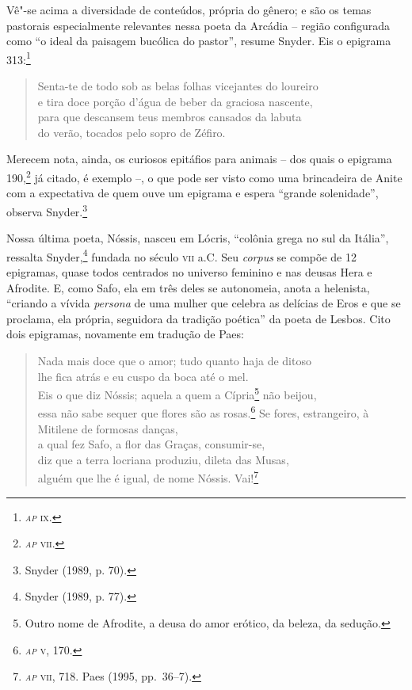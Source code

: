 Vê"-se acima a diversidade de conteúdos, própria do gênero; e são os temas
pastorais especialmente relevantes nessa poeta da Arcádia -- região configurada
como “o ideal da paisagem bucólica do pastor”, resume Snyder. Eis o epigrama
313:\footnote{\textit{\textsc{ap}} \textsc{ix}.}

\begin{verse}
\small{Senta-te de todo sob as belas folhas vicejantes do loureiro\\
e tira doce porção d’água de beber da graciosa nascente,\\
para que descansem teus membros cansados da labuta\\
do verão, tocados pelo sopro de Zéfiro.}
\end{verse}

Merecem nota, ainda, os curiosos epitáfios para animais -- dos quais o epigrama
190,\footnote{\textit{\textsc{ap}} \textsc{vii}.} já citado, é exemplo --, o que pode ser visto como uma
brincadeira de Anite com a expectativa de quem ouve um epigrama e espera
“grande solenidade”, observa Snyder.\footnote{ Snyder (1989, p. 70).} 

Nossa última poeta, Nóssis, nasceu em Lócris, “colônia grega no sul da Itália”,
ressalta Snyder,\footnote{Snyder (1989, p. 77).} fundada no século \textsc{vii} a.C. Seu \textit{corpus} se
compõe de 12 epigramas, quase todos centrados no
universo feminino e nas deusas Hera e Afrodite. E, como Safo, ela em três deles
se autonomeia, anota a helenista, ``criando a vívida \textit{persona} de uma
mulher que celebra as delícias de Eros e que se proclama, ela própria,
seguidora da tradição poética'' da poeta de Lesbos. Cito dois epigramas,
novamente em tradução de Paes:

\begin{verse}
\small{Nada mais doce que o amor; tudo quanto haja de ditoso\\
lhe fica atrás e eu cuspo da boca até o mel.\\
Eis o que diz Nóssis; aquela a quem a Cípria\footnote{ Outro nome de Afrodite, a deusa do amor erótico, da beleza, da sedução.} não beijou,\\
essa não sabe sequer que flores são as rosas.\footnote{\textit{\textsc{ap}} \textsc{v}, 170.}\medskip
Se fores, estrangeiro, à Mitilene de formosas danças,\\
a qual fez Safo, a flor das Graças, consumir-se,\\ 
diz que a terra locriana produziu, dileta das Musas,\\
alguém que lhe é igual, de nome Nóssis. Vai!}\footnote{\textit{\textsc{ap}} \textsc{vii}, 718. Paes (1995, pp.~36--7).}
\end{verse}

